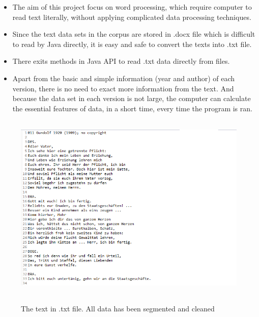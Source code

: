 \begin{itemize}
	\item \textbf{} The aim of this project focus on word processing, which require computer to read text literally, without applying complicated data processing techniques.
	\item \textbf{} Since the text data sets in the corpus are stored in .docx file which is difficult to read by Java directly, it is easy and safe to convert the texts into .txt file.
	\item \textbf{} There exits methods in Java API to read .txt data directly from files.
	\item \textbf{} Apart from the basic and simple information (year and author) of each version, there is no need to exact more information from the text. And because the data set in each version is not large, the computer can calculate the essential features of data, in a short time, every time the program is ran. 
\end{itemize}
\begin{figure}[h]
	\centering	
	\includegraphics[width=13cm, height=9cm]{Figs/Data-example}\\[1ex]
	\caption{The text in .txt file. All data has been segmented and cleaned}
	\label{fig:dataExample}
\end{figure}




